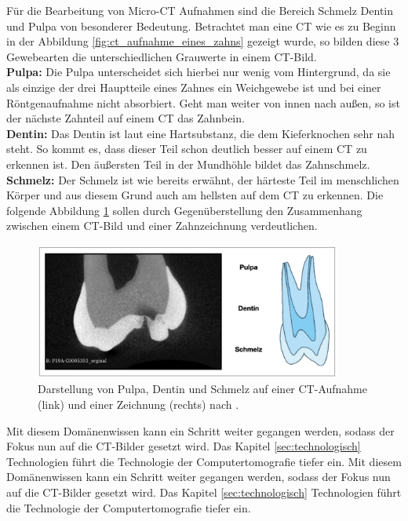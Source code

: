 Für die Bearbeitung von Micro-CT Aufnahmen sind die Bereich Schmelz Dentin und Pulpa
von besonderer Bedeutung. Betrachtet man eine CT wie es zu Beginn in der
Abbildung \ref{fig:ct_aufnahme_eines_zahns} gezeigt wurde, so bilden diese 3 Gewebearten
die unterschiedlichen Grauwerte in einem CT-Bild. \\ \textbf{Pulpa:} Die Pulpa unterscheidet
sich hierbei nur wenig vom Hintergrund, da sie als einzige der drei Hauptteile
eines Zahnes ein Weichgewebe ist und bei einer Röntgenaufnahme nicht absorbiert.
Geht man weiter von innen nach außen, so ist der nächste Zahnteil auf einem CT
das Zahnbein. \\ \textbf{Dentin:} Das Dentin ist laut \citet[Seite 41]{lehmann2012Zahnheilkunde}
eine Hartsubstanz, die dem Kieferknochen sehr nah steht. So kommt es, dass dieser
Teil schon deutlich besser auf einem CT zu erkennen ist. Den äußersten Teil in
der Mundhöhle bildet das Zahnschmelz. \\ \textbf{Schmelz:} Der Schmelz ist wie
bereits erwähnt, der härteste Teil im menschlichen Körper und aus diesem Grund auch
am hellsten auf dem CT zu erkennen. Die folgende Abbildung
\ref{fig:pulpa_dentin_schmelz} sollen durch Gegenüberstellung den Zusammenhang
zwischen einem CT-Bild und einer Zahnzeichnung verdeutlichen.

\begin{figure}[h]
	\centering
	\includegraphics[width=0.9\textwidth]{
		img/Bildschirmfoto 2024-11-22 um 15.13.24.jpg
	}
	\caption{Darstellung von Pulpa, Dentin und Schmelz auf einer CT-Aufnahme (link)
	und einer Zeichnung (rechts) nach \citet[Seite 29]{lehmann2012Zahnheilkunde}. }
	\label{fig:pulpa_dentin_schmelz}
\end{figure}

Mit diesem Domänenwissen kann ein Schritt weiter gegangen werden, sodass der
Fokus nun auf die CT-Bilder gesetzt wird. Das Kapitel \ref{sec:technologisch} Technologien
führt die Technologie der Computertomografie tiefer ein. Mit diesem
Domänenwissen kann ein Schritt weiter gegangen werden, sodass der Fokus nun auf die
CT-Bilder gesetzt wird. Das Kapitel \ref{sec:technologisch} Technologien führt
die Technologie der Computertomografie tiefer ein.

